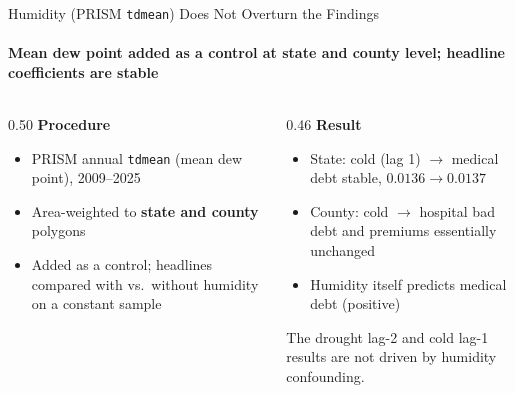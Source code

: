 \documentclass[aspectratio=169,11pt]{beamer}
\newcommand{\emphcolor}[1]{{\color{WarmOrange}\textbf{#1}}}
\newcommand{\tealtext}[1]{{\color{Teal}#1}}
\newcommand{\graytext}[1]{{\color{WarmGray}#1}}
\begin{document}
\begin{frame}{Humidity (PRISM \texttt{tdmean}) Does Not Overturn the Findings}
  \framesubtitle{Mean dew point added as a control at state and county level; headline coefficients are stable}
  \begin{columns}[T]
    \begin{column}{0.50\textwidth}
      \footnotesize
      \textbf{\tealtext{Procedure}}
      \begin{itemize}\itemsep0.12em
        \item PRISM annual \texttt{tdmean} (mean dew point), 2009--2025
        \item Area-weighted to \emphcolor{state and county} polygons
        \item Added as a control; headlines compared with vs.\ without humidity on a constant sample
      \end{itemize}
    \end{column}
    \begin{column}{0.46\textwidth}
      \footnotesize
      \textbf{\tealtext{Result}}
      \begin{itemize}\itemsep0.12em
        \item State: cold (lag 1) \(\to\) medical debt stable, \(0.0136 \to 0.0137\)
        \item County: cold \(\to\) hospital bad debt and premiums essentially unchanged
        \item Humidity itself predicts medical debt (positive)
      \end{itemize}
      \vspace{0.3em}
      \graytext{\scriptsize The drought lag-2 and cold lag-1 results are not driven by humidity confounding.}
    \end{column}
  \end{columns}
\end{frame}
\end{document}

